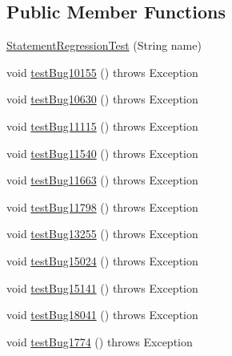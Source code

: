 \subsection*{Public Member Functions}
\begin{DoxyCompactItemize}
\item 
\mbox{\hyperlink{classtestsuite_1_1regression_1_1_statement_regression_test_a8e0f198acfbe47561686edd750a55349}{Statement\+Regression\+Test}} (String name)
\item 
void \mbox{\hyperlink{classtestsuite_1_1regression_1_1_statement_regression_test_a662e79a8152a1c9cefcfde5ea2a7c046}{test\+Bug10155}} ()  throws Exception 
\item 
void \mbox{\hyperlink{classtestsuite_1_1regression_1_1_statement_regression_test_a5cd95ffb44229da2afd247495385088c}{test\+Bug10630}} ()  throws Exception 
\item 
void \mbox{\hyperlink{classtestsuite_1_1regression_1_1_statement_regression_test_a5eed5fd0591511a13f3159bd29366e80}{test\+Bug11115}} ()  throws Exception 
\item 
void \mbox{\hyperlink{classtestsuite_1_1regression_1_1_statement_regression_test_a604d1382ce11355dcdefb57bccf8fc4b}{test\+Bug11540}} ()  throws Exception 
\item 
void \mbox{\hyperlink{classtestsuite_1_1regression_1_1_statement_regression_test_aad9a4a5d28e804097e535c055838a4e6}{test\+Bug11663}} ()  throws Exception 
\item 
void \mbox{\hyperlink{classtestsuite_1_1regression_1_1_statement_regression_test_a2e9381e517b516fe84e4574229646579}{test\+Bug11798}} ()  throws Exception 
\item 
void \mbox{\hyperlink{classtestsuite_1_1regression_1_1_statement_regression_test_a19979b206b845d9832b82138c997334b}{test\+Bug13255}} ()  throws Exception 
\item 
void \mbox{\hyperlink{classtestsuite_1_1regression_1_1_statement_regression_test_a91138e5fec8feb1b3680bca0bad7700d}{test\+Bug15024}} ()  throws Exception 
\item 
void \mbox{\hyperlink{classtestsuite_1_1regression_1_1_statement_regression_test_a8a46a6b40cf258db53a37cc247872520}{test\+Bug15141}} ()  throws Exception 
\item 
void \mbox{\hyperlink{classtestsuite_1_1regression_1_1_statement_regression_test_a0f8ea527be14f3f0a245ffcfb36f0c58}{test\+Bug18041}} ()  throws Exception 
\item 
void \mbox{\hyperlink{classtestsuite_1_1regression_1_1_statement_regression_test_add9e8195c4dbc3b4b95a1bc7ee5f5066}{test\+Bug1774}} ()  throws Exception 

\end{DoxyCompactItemize}

